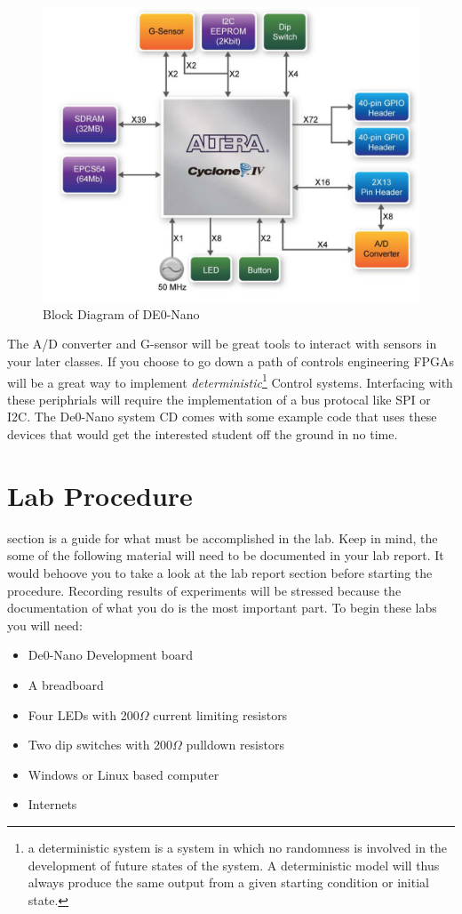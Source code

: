       \begin{figure}[htpb]
        \includegraphics[width=.48\textwidth]{Images/DEONanoBlockDiagram.png}
        \caption{Block Diagram of DE0-Nano \cite{DE0Manual}}
        \label{DEOBlockDia}
      \end{figure}
      The A/D converter and G-sensor will be great tools to interact with sensors in your later classes. If you choose to go down a path of controls engineering FPGAs will be a great way to implement {\it deterministic}\footnote{a deterministic system is a system in which no randomness is involved in the development of future states of the system. A deterministic model will thus always produce the same output from a given starting condition or initial state.\cite{DynamicSystems}} Control systems. Interfacing with these periphrials will require the implementation of a bus protocal like SPI or I2C. The De0-Nano system CD comes with some example code that uses these devices that would get the interested student off the ground in no time.

  \section{Lab Procedure}
     section is a guide for what must be accomplished in the lab. Keep in mind, the some of the following material will need to be documented in your lab report. It would behoove you to take a look at the lab report section before starting the procedure. Recording results of experiments will be stressed because the documentation of what you do is the most important part. To begin these labs you will need:
    \begin{itemize}
      \item De0-Nano Development board
      \item A breadboard
      \item Four LEDs with 200$\Omega$ current limiting resistors
      \item Two dip switches with 200$\Omega$ pulldown resistors
      \item Windows or Linux based computer
      \item Internets
    \end{itemize}
    

